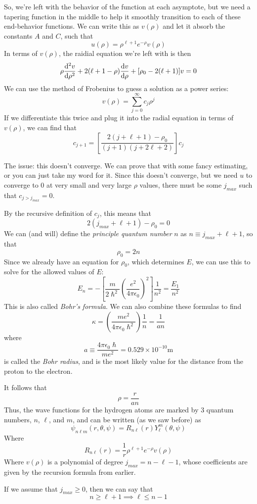 \documentclass[a4paper]{article}
\begin{document}
So, we're left with the behavior of the function at each asymptote, but we
need a tapering function in the middle to help it smoothly transition to each
of these end-behavior functions. We can write this as $v(\rho)$ and let it
absorb the constants $A$ and $C$, such that
\[ u(\rho) = \rho^{\ell+1}e^{-\rho}v(\rho) \]
In terms of $v(\rho)$, the raidial equation we're left with is then
\[ \rho \frac{\mathrm{d} ^2v}{\mathrm{d} \rho^2}+2(\ell+1-\rho)\frac{\mathrm{d} v}{\mathrm{d} \rho}+[\rho_0-2(\ell+1)]v=0 \]
We can use the method of Frobenius to guess a solution as a power series:
\[ v(\rho) = \sum_{j=0}^{\infty} c_j\rho^j \]
If we differentiate this twice and plug it into the radial equation in terms of
$v(\rho)$, we can find that
\[ c_{j+1} = \left[\frac{2(j+\ell+1)-\rho_0}{(j+1)(j+2\ell+2)}\right]c_j\]

The issue: this doesn't converge. We can prove that with some fancy estimating,
or you can just take my word for it. Since this doesn't converge, but we need
$u$ to converge to 0 at very small and very large $\rho$ values, there must be
some $j_{max}$ such that $c_{j>j_{max}}=0$.

By the recursive definition of $c_j$, this means that
\[ 2(j_{max}+\ell+1)-\rho_0 = 0 \]
We can (and will) define the \emph{principle quantum number} $n$ as
$n \equiv j_{max}+\ell+1$, so that
\[ \rho_0 = 2n \]
Since we already have an equation for $\rho_0$, which determines $E$, we can
use this to solve for the allowed values of $E$:
\[ E_n = -\left[\frac{m}{2\hslash^2}\left(\frac{e^2}{4\pi\epsilon_0}\right)^2
\right]\frac{1}{n^2} = \frac{E_1}{n^2} \]
This is also called \emph{Bohr's formula}.
We can also combine these formulas
to find
\[ \kappa = \left(\frac{me^2}{4\pi\epsilon_0\hslash^2}\right)\frac{1}{n}=
\frac{1}{an} \]
where
\[a \equiv \frac{4\pi\epsilon_0\hslash}{me^2} = 0.529\times10^{-10}\mathrm{m}\]
is called the \emph{Bohr radius}, and is the most likely value for the distance
from the proton to the electron.

It follows that
\[ \rho = \frac{r}{an} \]
Thus, the wave functions for the hydrogen atoms are marked by 3 quantum
numbers, $n$, $\ell$, and $m$, and can be written (as we saw before) as
\[ \psi_{n\ell m}(r,\theta,\psi) = R_{n\ell}(r)Y_\ell^m(\theta,\psi) \]
Where
\[ R_{n\ell}(r) = \frac{1}{r}\rho^{\ell+1}e^{-\rho}v(\rho)\]
Where $v(\rho)$ is a polynomial of degree $j_{max}=n-\ell-1$, whose
coefficients are given by the recursion formula from earlier.

If we assume that $j_{max} \geq 0$, then we can say that
\[ n \geq \ell + 1 \implies \ell \leq n - 1 \]
\end{document}
